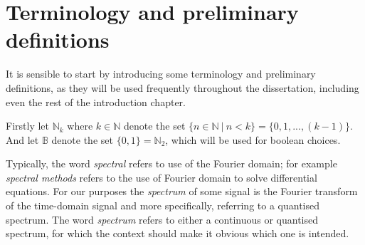 \documentclass[12pt,twoside,notitlepage]{report}
\newcommand{\bb}[1]{\mathbb{#1}}
\begin{document}
    \section{Terminology and preliminary definitions} \label{sec:term_and_def}
        It is sensible to start by introducing some terminology and preliminary definitions, as they will be used frequently throughout the 
        dissertation, including even the rest of the introduction chapter.

        Firstly let $\bb{N}_k$ where $k\in \bb{N}$ denote the set $\{ n \in \bb{N}\ |\ n < k \} = 
        \{0, 1, ..., (k-1)\}$. And let $\bb{B}$ denote the set $\{0, 1\} = \bb{N}_2$, which will be used for boolean choices.

        Typically, the word \textit{spectral} refers to use of the Fourier domain; for example 
        \textit{spectral methods} refers to the use of Fourier domain to solve differential equations. For our 
        purposes the \textit{spectrum} of some signal is the Fourier transform of the time-domain signal and more 
        specifically, referring to a quantised spectrum. The word \textit{spectrum} refers to 
        either a continuous or quantised spectrum, for which the context should make it obvious which one is 
        intended. 
\end{document}
